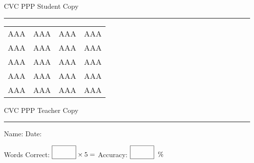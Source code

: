 \documentclass{memoir}
\begin{document}

\footnotesize \noindent
CVC PPP \hfill Student Copy
\smallskip
\hrule

\huge

\setlength{\tabcolsep}{14pt}
\def\arraystretch{2}

{\selectfont


\begin{vplace}[0.5]
\begin{center}
\begin{tabular}{cccc}
AAA & AAA & AAA & AAA \\
AAA & AAA & AAA & AAA \\
AAA & AAA & AAA & AAA \\
AAA & AAA & AAA & AAA \\
AAA & AAA & AAA & AAA \\
\end{tabular}
\end{center}
\end{vplace}

}

\newpage

\footnotesize \noindent
CVC PPP \hfill Teacher Copy
\smallskip
\hrule

\normalsize

\vfill

\noindent
Name: \underline{\hspace{1.75in}} \hfill Date: \underline{\hspace{1in}}

\huge

{\selectfont



}

\normalsize

Words Correct: $\fbox{\phantom{\huge 100}} \times 5 = $ Accuracy: $\fbox{\phantom{\huge 100}}\;\; \%$ 

\vfill

\end{document}
